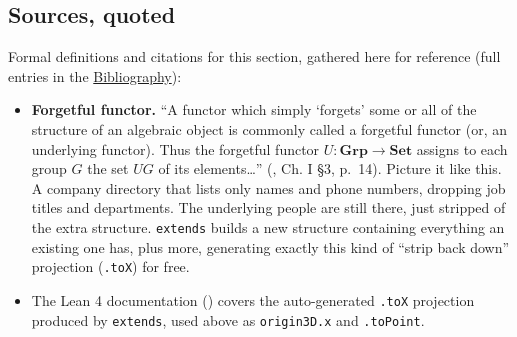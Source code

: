 \begin{center}

\end{center}

\subsection{Sources, quoted}\label{sec:03-functions-and-structures:03-extending-structures:3}

Formal definitions and citations for this section, gathered here for reference (full entries in the \hyperref[sec:root:bibliography:1]{Bibliography}):

\begin{itemize}
\tightlist
\item
  \textbf{Forgetful functor.} ``A functor which simply `forgets' some or all of the structure of an algebraic object is commonly called a forgetful functor (or, an underlying functor). Thus the forgetful functor \(U : \mathbf{Grp} \to \mathbf{Set}\) assigns to each group \(G\) the set \(UG\) of its elements\ldots{}'' (\cite{MacLane1998}, Ch. I §3, p.~14). Picture it like this. A company directory that lists only names and phone numbers, dropping job titles and departments. The underlying people are still there, just stripped of the extra structure. \texttt{extends} builds a new structure containing everything an existing one has, plus more, generating exactly this kind of ``strip back down'' projection (\texttt{.toX}) for free.
\item
  The Lean 4 documentation (\cite{LeanDocs}) covers the auto-generated \texttt{.toX} projection produced by \texttt{extends}, used above as \texttt{origin3D.x} and \texttt{.toPoint}.
\end{itemize}
